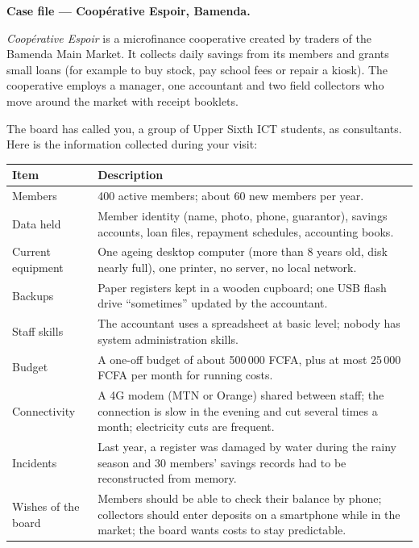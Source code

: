 \documentclass[11pt]{article}
\newcounter{popsec}
\newcounter{popsub}
\newcommand{\courssub}[1]{%
  \stepcounter{popsub}%
  \par\vspace{9pt}\noindent{\popxbold\fontsize{11.5}{13}\selectfont\color{popink}{\color{poporange}\thepopsec.\thepopsub}\hspace{6pt}#1}\par\nopagebreak\vspace{4pt}
}
\begin{document}
\courssub{Situation}

\textbf{Case file --- Coopérative Espoir, Bamenda.}\par

\emph{Coopérative Espoir} is a microfinance cooperative created by traders of the Bamenda Main Market. It collects daily savings from its members and grants small loans (for example to buy stock, pay school fees or repair a kiosk). The cooperative employs a manager, one accountant and two field collectors who move around the market with receipt booklets.

The board has called you, a group of Upper Sixth ICT students, as consultants. Here is the information collected during your visit:

\begin{center}
\begin{tabularx}{\linewidth}{|l|X|}
\hline
\rowcolor{popblueL} \textbf{Item} & \textbf{Description} \\
\hline
Members & 400 active members; about 60 new members per year. \\
\hline
Data held & Member identity (name, photo, phone, guarantor), savings accounts, loan files, repayment schedules, accounting books. \\
\hline
Current equipment & One ageing desktop computer (more than 8 years old, disk nearly full), one printer, no server, no local network. \\
\hline
Backups & Paper registers kept in a wooden cupboard; one USB flash drive ``sometimes'' updated by the accountant. \\
\hline
Staff skills & The accountant uses a spreadsheet at basic level; nobody has system administration skills. \\
\hline
Budget & A one-off budget of about 500\,000 FCFA, plus at most 25\,000 FCFA per month for running costs. \\
\hline
Connectivity & A 4G modem (MTN or Orange) shared between staff; the connection is slow in the evening and cut several times a month; electricity cuts are frequent. \\
\hline
Incidents & Last year, a register was damaged by water during the rainy season and 30 members' savings records had to be reconstructed from memory. \\
\hline
Wishes of the board & Members should be able to check their balance by phone; collectors should enter deposits on a smartphone while in the market; the board wants costs to stay predictable. \\
\hline
\end{tabularx}
\end{center}
\end{document}
